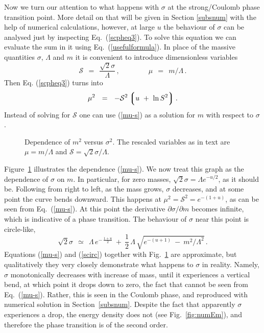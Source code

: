 \documentclass[epsfig,12pt]{article}
\def\beq{\begin{equation}}
\def\eeq{\end{equation}}
\newcommand{\cs}{{\mathcal S}}
\def\beq{\begin{equation}}
\def\eeq{\end{equation}}
\newcommand{\p}{\partial}
\newcommand{\lgr}{\left\lgroup}
\newcommand{\rgr}{\right\rgroup}
\begin{document}
{%

Now we turn our attention to what happens with $\sigma $ at the strong/Coulomb
phase transition point.
More detail on that will be given in Section \ref{subsnum} with the help
of numerical calculations, however, at large $u$ the behaviour of $\sigma$ can be analysed 
just by inspecting Eq.~(\ref{scpheq3}). 
To solve this equation we can evaluate the sum in it using Eq.~(\ref{usefulformula}).
In place of the massive quantities $ \sigma $, $\Lambda $ and $ m $ it is convenient to 
introduce dimensionless variables
\beq
	\cs ~~=~~ \frac{\sqrt{2} \sigma}{\Lambda}\,, \qquad\qquad
        \mu ~~=~~ m/\Lambda\,.
\label{csdef}
\eeq
Then Eq. (\ref{scpheq3}) turns into
\beq
\label{mu-s}
	\mu^2  ~~=~~ - \cs^2 \lgr u  ~+~ \ln S^2 \rgr .
\eeq
Instead of solving for $ \cs $ one can use (\ref{mu-s}) as a solution for $ m $ with respect 
to $ \sigma $.
\begin{figure}
\centerline{\resizebox{11cm}{!}{}}
\caption{\small Dependence of $m^2$ versus $\sigma^2$. The rescaled variables as in text are
$\mu = m/\Lambda$ and $\cs = \sqrt{2}\sigma/\Lambda$. }
\label{fig:mus}
\end{figure}
Figure~\ref{fig:mus} illustrates the dependence (\ref{mu-s}). 
We now treat this graph as the dependence of $ \sigma $ on  $m$.
In particular, for zero masses, $ \sqrt{2}\sigma = \Lambda e^{-u/2} $, as it should be.
Following from right to left, as the mass grows, $ \sigma $ decreases, and at some point 
the curve bends downward. 
This happens at $ \mu^2 = \cs^2 = e^{-(1+u)}$, as can be seen from Eq.~(\ref{mu-s}). 
At this point the derivative $ \p\sigma/\p m $ becomes infinite, which is indicative of a
phase transition. 
The behaviour of $ \sigma $ near this point is circle-like,
\beq
\label{scirc}
	\sqrt{2}\sigma ~~\simeq~~ \Lambda\, e^{-\, \frac{1+u}{2}}  ~+~ 
		\frac{1}{2}\,\Lambda\, \sqrt{e^{- (u+1)} ~-~ m^2/\Lambda^2 } \,.
\eeq
Equations (\ref{mu-s}) and  (\ref{scirc}) together with Fig.~\ref{fig:mus} are approximate, but qualitatively
they very closely demonstrate what happens to $ \sigma $ in reality. 
Namely, $ \sigma $ monotonically decreases with increase of mass, 
until it experiences a vertical bend, at which point
it drops down to zero, the fact that cannot be seen from Eq.~(\ref{mu-s}). 
Rather, this is seen in the Coulomb phase, and reproduced with numerical solution in Section~\ref{subsnum}.
Despite the fact that apparently $ \sigma $ experiences a drop, the energy density does not
(see Fig.~\ref{fig:numEm}), and therefore the phase transition is of the second order. 

}
\end{document}
